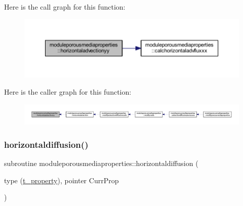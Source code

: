 Here is the call graph for this function\+:\nopagebreak
\begin{figure}[H]
\begin{center}
\leavevmode
\includegraphics[width=350pt]{namespacemoduleporousmediaproperties_a4de4628b721cc4ace9457a05e6b46f11_cgraph}
\end{center}
\end{figure}
Here is the caller graph for this function\+:\nopagebreak
\begin{figure}[H]
\begin{center}
\leavevmode
\includegraphics[width=350pt]{namespacemoduleporousmediaproperties_a4de4628b721cc4ace9457a05e6b46f11_icgraph}
\end{center}
\end{figure}
\mbox{\label{namespacemoduleporousmediaproperties_a46d137d0c183e1c9fcad5f72b1101ffd}} 
\subsubsection{\texorpdfstring{horizontaldiffusion()}{horizontaldiffusion()}}
{\footnotesize\ttfamily subroutine moduleporousmediaproperties\+::horizontaldiffusion (\begin{DoxyParamCaption}\item[{type (\mbox{\hyperlink{structmoduleporousmediaproperties_1_1t__property}{t\+\_\+property}}), pointer}]{Curr\+Prop }\end{DoxyParamCaption})\hspace{0.3cm}{\ttfamily [private]}}

